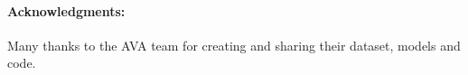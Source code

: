 \documentclass{article}
\begin{document}
  


\paragraph{Acknowledgments:} Many thanks to the AVA team for creating and sharing their dataset, models and code.

{\small
  
}
\end{document}
